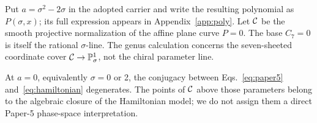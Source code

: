 Put $a=\sigma^2-2\sigma$ in the adopted carrier and write the resulting
polynomial as $P(\sigma,x)$; its full expression appears in
Appendix~\ref{app:poly}.  Let $\mathcal C$ be the smooth projective normalization
of the affine plane curve $P=0$.  The base $C_7=0$ is itself the rational
$\sigma$-line.  The genus calculation concerns the seven-sheeted coordinate
cover $\mathcal C\to\mathbb P^1_\sigma$, not the chiral parameter line.

At $a=0$, equivalently $\sigma=0$ or 2, the conjugacy between
Eqs.~\eqref{eq:paper5} and~\eqref{eq:hamiltonian} degenerates.  The points of
$\mathcal C$ above those parameters belong to the algebraic closure of the
Hamiltonian model; we do not assign them a direct Paper-5 phase-space
interpretation.
